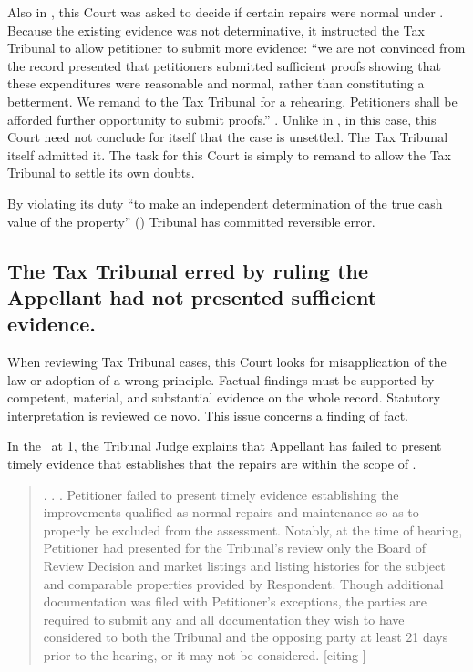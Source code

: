 \documentclass[12pt,\documentclassflag]{michiganCourtOfAppealsBrief}
\def\mathieuGast{\pincite[l]{MCL}{211.27(2)}}
\def\ttr287{\pincite[s]{TTR}{287}}
\begin{document}
Also in \cite{Fisher}, this Court was asked to decide if certain repairs were normal under \mathieuGast. Because the existing evidence was not determinative, it instructed the Tax Tribunal to allow petitioner to submit more evidence: ``we are not convinced from the record presented that petitioners submitted sufficient proofs showing that these expenditures were reasonable and normal, rather than constituting a betterment. We remand to the Tax Tribunal for a rehearing. Petitioners shall be afforded further opportunity to submit proofs.'' . Unlike in \cite[s]{Fisher}, in this case, this Court need not conclude for itself that the case is unsettled. The Tax Tribunal itself admitted it. The task for this Court is simply to remand to allow the Tax Tribunal to settle its own doubts.

By violating its duty ``to make an independent determination of the true cash value of the property'' () Tribunal has committed reversible error. 

\subsection{The Tax Tribunal erred by ruling the Appellant had not presented sufficient evidence.}

When reviewing Tax Tribunal cases, this Court looks for misapplication of the law or adoption of a wrong principle. Factual findings must be supported by competent, material, and substantial evidence on the whole record. Statutory interpretation is reviewed de novo.  This issue concerns a finding of fact.

In the \FOJ\ at 1, the Tribunal Judge explains that Appellant has failed to present timely evidence that establishes that the repairs are within the scope of \mathieuGast. 


\begin{quote}  
. . .  Petitioner failed to present timely evidence establishing the improvements qualified as normal repairs and maintenance so as to properly be excluded from the assessment. Notably, at the time of hearing, Petitioner had presented for the Tribunal's review only the Board of Review Decision and market listings and listing histories for the subject and comparable properties provided by Respondent. Though additional documentation was filed with Petitioner's exceptions, the parties are required to submit any and all documentation they wish to have considered to both the Tribunal and the opposing party at least 21 days prior to the hearing, or it may not be considered. [citing \ttr287]
\end{quote}
\end{document}
